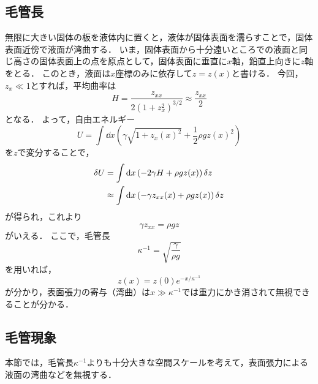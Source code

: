 \documentclass[a4paper,11pt]{jsarticle}
\begin{document}
\subsection{毛管長}
無限に大きい固体の板を液体内に置くと，液体が固体表面を濡らすことで，固体表面近傍で液面が湾曲する．
いま，固体表面から十分遠いところでの液面と同じ高さの固体表面上の点を原点として，固体表面に垂直に$x$軸，鉛直上向きに$z$軸をとる．
このとき，液面は$x$座標のみに依存して$z=z(x)$と書ける．
今回，$z_{x} \ll 1$とすれば，平均曲率は
\begin{equation}
  H = \frac{z_{xx}}{2(1+z_x^2)^{3/2}} \approx \frac{z_{xx}}{2}
\end{equation}
となる．
よって，自由エネルギー
\begin{equation}
  U = \int \dd{x} \left(\gamma \sqrt{1+z_x(x)^2} + \frac{1}{2} \rho g z(x)^2 \right)
\end{equation}
を$z$で変分することで，
\begin{align}
  \delta U &= \int \dd{x} \left(-2\gamma H + \rho g z(x) \right)\delta z \notag\\
  &\approx \int \dd{x} \left(-\gamma z_{xx}(x) + \rho g z(x) \right)\delta z
\end{align}
が得られ，これより
\begin{equation}
  \gamma z_{xx} = \rho g z
\end{equation}
がいえる．
ここで，毛管長
\begin{equation}
  \kappa^{-1} = \sqrt{\frac{\gamma}{\rho g}}
\end{equation}
を用いれば，
\begin{equation}
  z(x) = z(0)e^{-x/\kappa^{-1}}
\end{equation}
が分かり，表面張力の寄与（湾曲）は$x\gg \kappa^{-1}$では重力にかき消されて無視できることが分かる．

\subsection{毛管現象}
本節では，毛管長$\kappa^{-1}$よりも十分大きな空間スケールを考えて，表面張力による液面の湾曲などを無視する．
\end{document}
